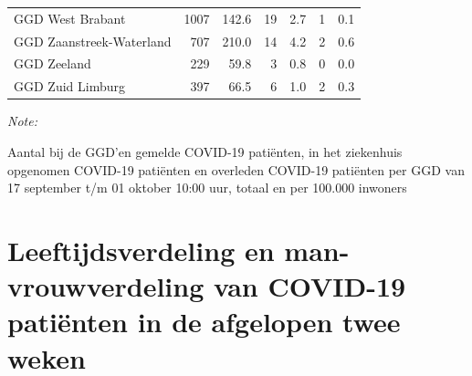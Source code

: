 \documentclass[
  english,
  man,floatsintext]{apa6}
\begin{document}
\begin{table}[H]
\begin{threeparttable}
\begin{tabular}{lrrrrrr}
GGD West Brabant & 1007 & 142.6 & 19 & 2.7 & 1 & 0.1\\
GGD Zaanstreek-Waterland & 707 & 210.0 & 14 & 4.2 & 2 & 0.6\\
GGD Zeeland & 229 & 59.8 & 3 & 0.8 & 0 & 0.0\\
GGD Zuid Limburg & 397 & 66.5 & 6 & 1.0 & 2 & 0.3\\
\bottomrule
\end{tabular}
\begin{tablenotes}
\item \textit{Note: } 
\item Aantal bij de GGD’en gemelde COVID-19 patiënten, in het ziekenhuis opgenomen COVID-19 patiënten en overleden COVID-19 patiënten per GGD van 17 september t/m 01 oktober 10:00 uur, totaal en per 100.000 inwoners
\end{tablenotes}
\end{threeparttable}
\endgroup{}
\end{table}

\newpage

\hypertarget{leeftijdsverdeling-en-man-vrouwverdeling-van-covid-19-patiuxebnten-in-de-afgelopen-twee-weken}{%
\section{Leeftijdsverdeling en man-vrouwverdeling van COVID-19 patiënten in de afgelopen twee weken}\label{leeftijdsverdeling-en-man-vrouwverdeling-van-covid-19-patiuxebnten-in-de-afgelopen-twee-weken}}
\end{document}
